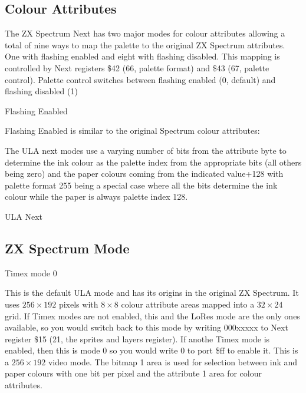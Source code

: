 \subsection{Colour Attributes}

The ZX Spectrum Next has two major modes for colour attributes
allowing a total of nine ways to map the palette to the original ZX
Spectrum attributes. One with flashing enabled and eight with flashing
disabled. This mapping is controlled by Next registers \$42 (66,
palette format) and \$43 (67, palette control).  Palette control
switches between flashing enabled (0, default) and flashing disabled
(1)

\begin{table}[h]\centering
  \caption{Flashing Enabled}
\end{table}

Flashing Enabled is similar to the original Spectrum colour attributes:

The ULA next modes use a varying number of bits from the attribute
byte to determine the ink colour as the palette index from the
appropriate bits (all others being zero) and the paper colours coming
from the indicated value+128 with palette format 255 being a special
case where all the bits determine the ink colour while the paper is
always palette index 128.

\begin{table}[h]\centering
  \caption{ULA Next}
\end{table}

\subsection{ZX Spectrum Mode}

Timex mode 0

This is the default ULA mode and has its origins in the original ZX
Spectrum. It uses $256\times192$ pixels with $8\times8$ colour
attribute areas mapped into a $32\times24$ grid. If Timex modes are
not enabled, this and the LoRes mode are the only ones available, so
you would switch back to this mode by writing 000xxxxx to Next
register \$15 (21, the sprites and layers register). If anothe Timex
mode is enabled, then this is mode 0 so you would write 0 to port \$ff
to enable it. This is a $256\times192$ video mode. The bitmap 1 area
is used for selection between ink and paper colours with one bit per
pixel and the attribute 1 area for colour attributes.

